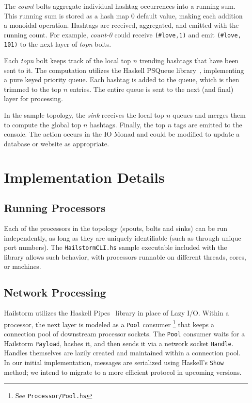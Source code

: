 \documentclass[10pt,nocopyrightspace]{sigplanconf}
\begin{document}
The \textit{count} bolts aggregate individual hashtag occurrences into a running
sum. This running sum is stored as a hash map 0 default value, making each addition 
a monoidal operation. Hashtags are received, aggregated, and emitted with the running count.
For example, \textit{count-0} could receive \texttt{(\#love,1)} and emit
\texttt{(\#love, 101)} to the next layer of \textit{topn} bolts.

Each \textit{topn} bolt keeps track of the local top $n$ trending hashtags 
that have been sent to it. The computation utilizes the Haskell PSQueue
library~\cite{psqueue}, implementing a pure keyed priority queue. Each hashtag
is added to the queue, which is then trimmed to the top $n$ entries. The entire
queue is sent to the next (and final) layer for processing.

In the sample topology, the \textit{sink} receives the local top $n$ queues 
and merges them to compute the global top $n$ hashtags. Finally, the top $n$
tags are emitted to the console. The action occurs in the IO Monad and could be 
modified to update a database or website as appropriate.

\section{Implementation Details}

\subsection{Running Processors}

Each of the processors in the topology (spouts, bolts and sinks) can be run
independently, as long as they are uniquely identifiable (such as through
unique port numbers). The \texttt{HailstormCLI.hs} sample executable included
with the library allows such behavior, with processors runnable on different
threads, cores, or machines.

\subsection{Network Processing}
\label{sec:network-processing}
Hailstorm utilizes the Haskell Pipes~\cite{pipes} library
in place of Lazy I/O. Within
a processor, the next layer is modeled as a \lstinline{Pool} consumer%
\footnote{See \texttt{Processor/Pool.hs}} that keeps a connection pool
of downstream processor sockets. The \lstinline{Pool} consumer waits for a
Hailstorm \lstinline{Payload}, hashes it, and then sends it via a network socket
\lstinline{Handle}. Handles themselves are lazily created and maintained within a
connection pool. In our initial implementation, messages are serialized using
Haskell's \texttt{Show} method; we intend to migrate to a more efficient
protocol in upcoming versions.
\end{document}
